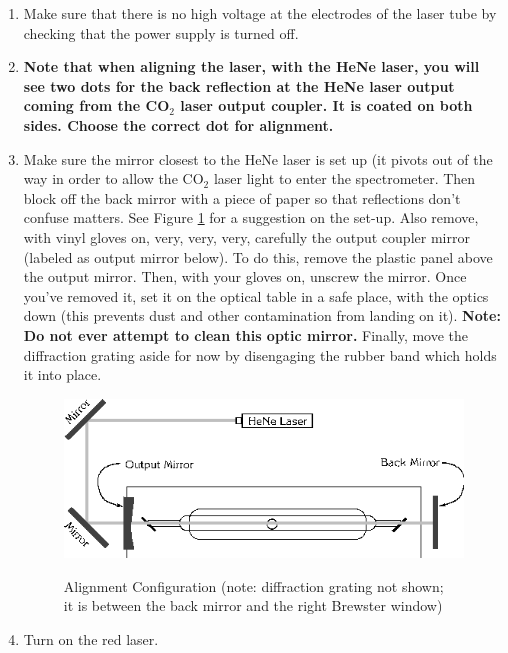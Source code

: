 \documentclass{../lab}
\begin{document}
\begin{enumerate}
    \item Make sure that there is no high voltage at the electrodes of the laser tube by checking that the power supply is turned off.

    \item \textbf{Note that when aligning the laser, with the HeNe laser, you will see two dots for the back reflection at the HeNe laser output coming from the CO$_2$ laser output coupler.  It is coated on both sides. Choose the correct dot for alignment.}

    \item Make sure the mirror closest to the HeNe laser is set up (it pivots out of the way in order to allow the CO$_2$ laser light to enter the spectrometer. Then block off the back mirror with a piece of paper so that reflections don't confuse matters. See Figure \ref{fig:AlignmentConfiguration} for a suggestion on the set-up. Also remove, with vinyl gloves on, very, very, very, carefully the output coupler mirror (labeled as output mirror below). To do this, remove the plastic panel above the output mirror. Then, with your gloves on, unscrew the mirror. Once you've removed it, set it on the optical table in a safe place, with the optics down (this prevents dust and other contamination from landing on it). \textbf{Note: Do not ever attempt to clean this optic mirror.} Finally, move the diffraction grating aside for now by disengaging the rubber band which holds it into place. 

    \begin{figure}[h]
    \captionsetup{justification=centering}
        \centering
        \href{http://experimentationlab.berkeley.edu/sites/default/files/images/CO24.gif}{\includegraphics[width=0.7\linewidth]{images/CO24.png}}
        \caption{Alignment Configuration (note: diffraction grating not shown;\\ it is between the back mirror and the right Brewster window)}
        \label{fig:AlignmentConfiguration}
    \end{figure}

    \item Turn on the red laser.
    

\end{enumerate}
\end{document}
